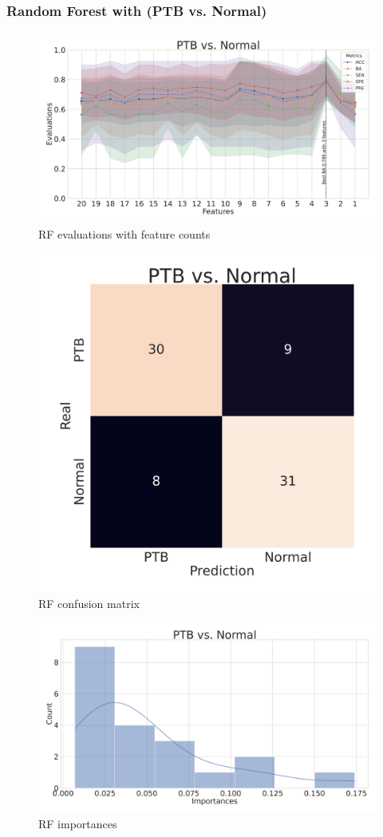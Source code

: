 \documentclass{beamer}
\begin{document}
    \begin{frame}[allowframebreaks]
        \frametitle{Random Forest with (PTB vs. Normal)}

        \begin{figure}
            \includegraphics[width=0.8 \linewidth]{figures/RandomForest_Proportion/RF-PTB.DADA2.homd.Mouth/metrics.pdf}
            \caption{RF evaluations with feature counts}
        \end{figure}

        \begin{figure}
            \includegraphics[width=0.5 \linewidth]{figures/RandomForest_Proportion/RF-PTB.DADA2.homd.Mouth/heatmap.pdf}
            \caption{RF confusion matrix}
        \end{figure}

        \begin{figure}
            \includegraphics[width=0.8 \linewidth]{figures/RandomForest_Proportion/RF-PTB.DADA2.homd.Mouth/importances.pdf}
            \caption{RF importances}
        \end{figure}


\end{frame}
\end{document}

